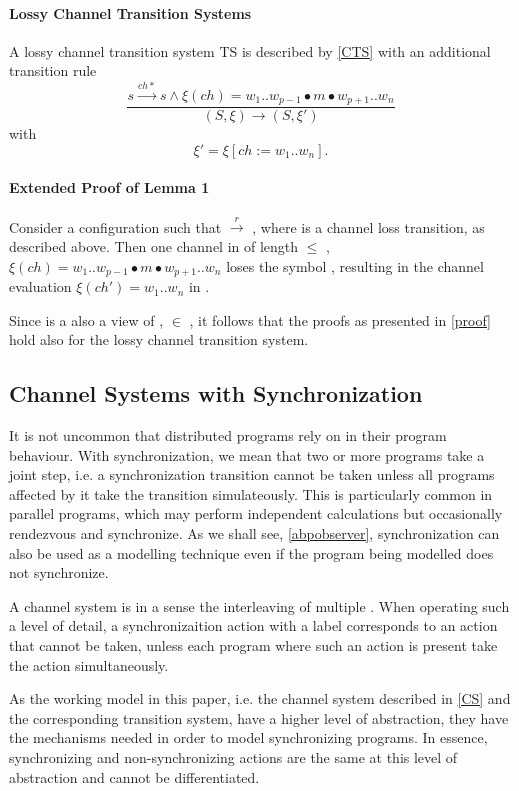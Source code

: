 \paragraph{Lossy Channel Transition Systems}
A lossy channel transition system TS is described by \ref{CTS} with an additional transition rule
      \[
      \dfrac{s \xrightarrow{ch*} s \wedge \xi(ch) = w_1..w_{p-1}\bullet m \bullet w_{p+1}..w_n}{(S, \xi) \rightarrow (S, \xi')} \] with \[ \xi' = \xi[ch:= w_1..w_n].
      \]

\paragraph{Extended Proof of Lemma 1}
Consider a configuration  such that  $\xrightarrow{r}$ , where  is a channel loss transition, as described above. Then one channel  in  of length  $\leq$ , $\xi(ch) = w_1..w_{p-1}\bullet m \bullet w_{p+1}..w_n$ loses the symbol , resulting in the channel evaluation $\xi(ch') = w_1..w_n$ in .

Since  is a also a view of ,  $\in$ , it follows that the proofs as presented in \ref{proof} hold also for the lossy channel transition system.

\subsection{Channel Systems with Synchronization}
It is not uncommon that distributed programs rely on  in their program behaviour. With synchronization, we mean that two or more programs take a joint step, i.e. a synchronization transition cannot be taken unless all programs affected by it take the transition simulateously. This is particularly common in parallel programs, which may perform independent calculations but occasionally rendezvous and synchronize. As we shall see, \ref{abpobserver}, synchronization can also be used as a modelling technique even if the program being modelled does not synchronize.

A channel system is in a sense the interleaving of multiple . When operating such a level of detail, a synchronizaition action with a label  corresponds to an action that cannot be taken, unless each program where such an action is present take the action simultaneously.

As the working model in this paper, i.e. the channel system described in \ref{CS} and the corresponding transition system, have a higher level of abstraction, they have the mechanisms needed in order to model synchronizing programs. In essence, synchronizing and non-synchronizing actions are the same at this level of abstraction and cannot be differentiated.

